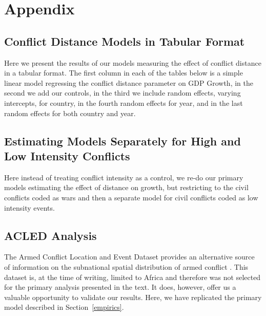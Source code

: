
\section{Appendix}
\label{appendix}

\subsection{Conflict Distance Models in Tabular Format}

Here we present the results of our models measuring the effect of conflict distance in a tabular format. The first column in each of the tables below is a simple linear model regressing the conflict distance parameter on GDP Growth, in the second we add our controls, in the third we include random effects, varying intercepts, for country, in the fourth random effects for year, and in the last random effects for both country and year. 





\FloatBarrier
\nepage

\subsection{Estimating Models Separately for High and Low Intensity Conflicts}

Here instead of treating conflict intensity as a control, we re-do our primary models estimating the effect of distance on growth, but restricting to the civil conflicts coded as wars and then a separate model for civil conflicts coded as low intensity events. 


\FloatBarrier

\newpage
\subsection{ACLED Analysis}
\label{acled}

The Armed Conflict Location and Event Dataset provides an alternative source of information on the subnational spatial distribution of armed conflict \citep{raleigh:linke:etal:2010}. This dataset is, at the time of writing, limited to Africa and therefore was not selected for the primary analysis presented in the text. It does, however, offer us a valuable opportunity to validate our results. Here, we have replicated the primary model described in Section~\ref{empirics}.

